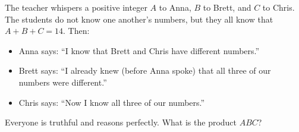 The teacher whispers a positive integer $A$ to Anna, $B$ to Brett, and $C$ to Chris. The students do not know one another's numbers, but they all know that $A+B+C=14$. Then:
\begin{itemize}
\item Anna says: ``I know that Brett and Chris have different numbers.''
\item Brett says: ``I already knew (before Anna spoke) that all three of our numbers were different.''
\item Chris says: ``Now I know all three of our numbers.''
\end{itemize}
Everyone is truthful and reasons perfectly. What is the product $ABC$?
